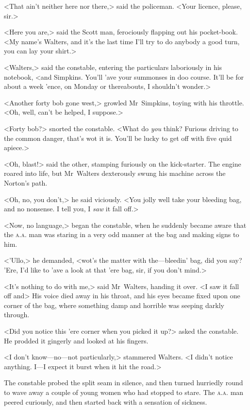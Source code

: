 <That ain't neither here nor there,> said the policeman. <Your licence, please, sir.>

<Here you are,> said the Scott man, ferociously flapping out his pocket-book. <My name's Walters, and it's the last time I'll try to do anybody a good turn, you can lay your shirt.>

<Walters,> said the constable, entering the particulars laboriously in his notebook, <and Simpkins. You'll 'ave your summonses in doo course. It'll be for about a week 'ence, on Monday or thereabouts, I shouldn't wonder.>

<Another forty bob gone west,> growled Mr~Simpkins, toying with his throttle. <Oh, well, can't be helped, I suppose.>

<Forty bob?> snorted the constable. <What do \textit{you} think? Furious driving to the common danger, that's wot it is. You'll be lucky to get off with five quid apiece.>

<Oh, blast!> said the other, stamping furiously on the kick-starter. The engine roared into life, but Mr~Walters dexterously swung his machine across the Norton's path.

<Oh, no, you don't,> he said viciously. <You jolly well take your bleeding bag, and no nonsense. I tell you, I \textit{saw} it fall off.>

<Now, no language,> began the constable, when he suddenly became aware that the \textsc{a.a.} man was staring in a very odd manner at the bag and making signs to him.

<'Ullo,> he demanded, <wot's the matter with the—bleedin' bag, did you say? 'Ere, I'd like to 'ave a look at that 'ere bag, sir, if you don't mind.>

<It's nothing to do with me,> said Mr~Walters, handing it over. <I saw it fall off and\longdash> His voice died away in his throat, and his eyes became fixed upon one corner of the bag, where something damp and horrible was seeping darkly through.

<Did you notice this 'ere corner when you picked it up?> asked the constable. He prodded it gingerly and looked at his fingers.

<I don't know—no—not particularly,> stammered Walters. <I didn't notice anything. I—I expect it burst when it hit the road.>

The constable probed the split seam in silence, and then turned hurriedly round to wave away a couple of young women who had stopped to stare. The \textsc{a.a.} man peered curiously, and then started back with a sensation of sickness.

